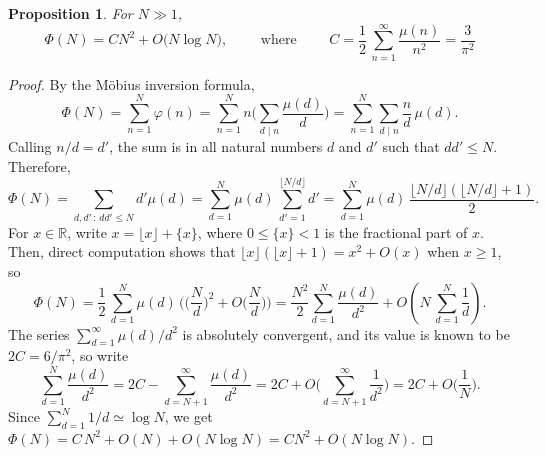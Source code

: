 \documentclass[11pt,reqno]{amsart}
\newtheorem{prop}[thm]{Proposition}
\theoremstyle{definition}
\begin{document}
\begin{prop}\label{thm:SumOfEulerFunction}
For $N \gg 1$,  
\begin{equation}
\Phi(N) 
= C N^2 + O\Big( N \log N \Big), 
\qquad \text{ where } \qquad C = \frac12 \, \sum_{n=1}^\infty \frac{\mu(n)}{n^2} = \frac{3}{\pi^2}
\end{equation}
\end{prop}
\begin{proof}
By the M\"obius inversion formula, 
\begin{equation}
\Phi(N) 
= \sum_{n = 1}^N \varphi(n) 
= \sum_{n=1}^N n \bigg( \sum_{d \mid n} \frac{\mu(d)}{d} \bigg) 
= \sum_{n=1}^N \sum_{d \mid n} \frac{n}{d}\, \mu(d).
\end{equation}
Calling $n/d = d'$, the sum is in all natural numbers $d$ and $d'$ such that $d d'  \leq N$. 
Therefore, 
\begin{equation}
\Phi(N) = \sum_{d, d' \, : \, dd' \leq N} d' \mu(d) = \sum_{d=1}^N \mu(d) \, \sum_{d'=1}^{\lfloor N/d \rfloor } d'  
= \sum_{d=1}^N \mu(d) \, \frac{ \lfloor N/d \rfloor \left( \lfloor N/d \rfloor + 1 \right) }{2}.
\end{equation}
For $x \in \mathbb R$, write $x = \lfloor x \rfloor + \{ x \}$, where $0 \leq \{ x \} < 1$ is the fractional part of $x$. Then, direct computation shows that $\lfloor x \rfloor \left( \lfloor x \rfloor + 1 \right) = x^2 + O(x)$ when $x \geq 1$, so 
\begin{equation}
\Phi(N) = \frac{1}{2} \, \sum_{d=1}^N \mu(d) \, \bigg( \Big( \frac{N}{d} \Big)^2 + O\Big(\frac{N}{d} \Big) \bigg) = \frac{N^2}{2} \sum_{d=1}^N \frac{\mu(d)}{d^2} + O\left( N \, \sum_{d=1}^N \frac{1}{d} \right).
\end{equation}
The series $\sum_{d=1}^\infty \mu(d)/d^2$ is absolutely convergent,
and its value is known to be $2C = 6/\pi^2$, 
so write 
\begin{equation}
\sum_{d=1}^N \frac{\mu(d)}{d^2} 
= 2C - \sum_{d=N+1}^\infty \frac{\mu(d)}{d^2} 
= 2C + O\bigg(  \sum_{d=N+1}^\infty \frac{1}{d^2} \bigg) 
= 2C + O\Big(  \frac{1}{N} \Big).
\end{equation}
Since 
$\sum_{d=1}^N 1/d \simeq \log N$, 
we get $\Phi(N) = C\, N^2 + O( N ) + O( N \log N) = CN^2 + O( N \log N)$. 
\end{proof}
\end{document}

